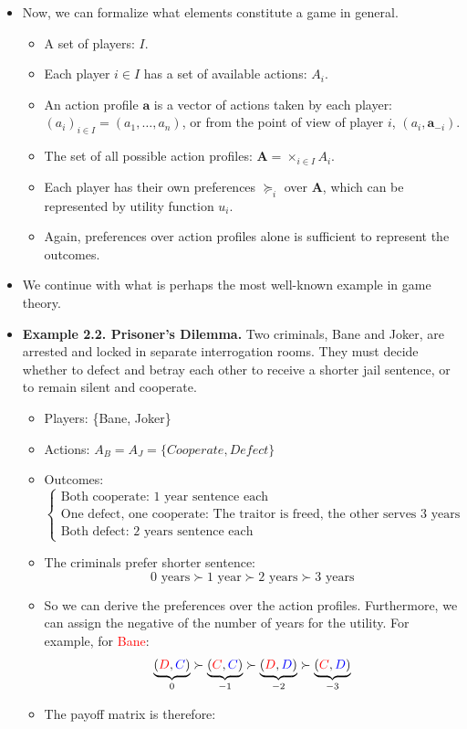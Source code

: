 \documentclass[notitlepage]{article}
\begin{document}
\begin{itemize}
    \item Now, we can formalize what elements constitute a game in general.
    \begin{itemize}
        \item A set of players: \(I\).
        \item Each player \(i \in I\) has a set of available actions: \(A_i\).
        \item An action profile \(\mathbf{a}\) is a vector of actions taken by each player: \((a_i)_{i \in I} = (a_1, \dots, a_n)\), or from the point of view of player \(i\), \((a_i, \mathbf{a}_{-i})\).
        \item The set of all possible action profiles: \(\mathbf{A} = \times_{i \in I}A_i\).
        \item Each player has their own preferences \(\succeq_i\) over \(\mathbf{A}\), which can be represented by utility function \(u_i\).
        \item Again, preferences over action profiles alone is sufficient to represent the outcomes.
    \end{itemize}
    \item We continue with what is perhaps the most well-known example in game theory.
    \item \textbf{Example 2.2. Prisoner's Dilemma.} Two criminals, Bane and Joker, are arrested and locked in separate interrogation rooms. They must decide whether to defect and betray each other to receive a shorter jail sentence, or to remain silent and cooperate.
    \begin{itemize}
        \item Players: \{Bane, Joker\}
        \item Actions: \(A_B = A_J = \{Cooperate, Defect\}\)
        \item Outcomes:
        \[
        \begin{cases}
            \text{Both cooperate: 1 year sentence each} \\
            \text{One defect, one cooperate: The traitor is freed, the other serves 3 years} \\
            \text{Both defect: 2 years sentence each}
        \end{cases}
        \]
        \item The criminals prefer shorter sentence:
        \[
        0\text{ years}\succ 1\text{ year} \succ 2\text{ years} \succ 3\text{ years}
        \]
        \item So we can derive the preferences over the action profiles. Furthermore, we can assign the negative of the number of years for the utility. For example, for \textcolor{red}{Bane}:
        \[
        \underbrace{(\textcolor{red}{D}, \textcolor{blue}{C})}_{0} \succ \underbrace{(\textcolor{red}{C}, \textcolor{blue}{C})}_{-1} \succ \underbrace{(\textcolor{red}{D}, \textcolor{blue}{D})}_{-2} \succ \underbrace{(\textcolor{red}{C}, \textcolor{blue}{D})}_{-3}
        \]
        \item The payoff matrix is therefore:


\end{itemize}
\end{itemize}
\end{document}
